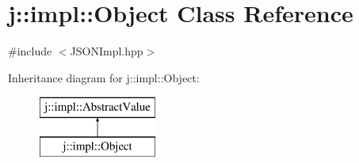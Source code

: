 \hypertarget{classj_1_1impl_1_1_object}{\section{j\-:\-:impl\-:\-:Object Class Reference}
\label{classj_1_1impl_1_1_object}
}


{\ttfamily \#include $<$J\-S\-O\-N\-Impl.\-hpp$>$}

Inheritance diagram for j\-:\-:impl\-:\-:Object\-:\begin{figure}[H]
\begin{center}
\leavevmode
\includegraphics[height=2.000000cm]{classj_1_1impl_1_1_object}
\end{center}
\end{figure}
